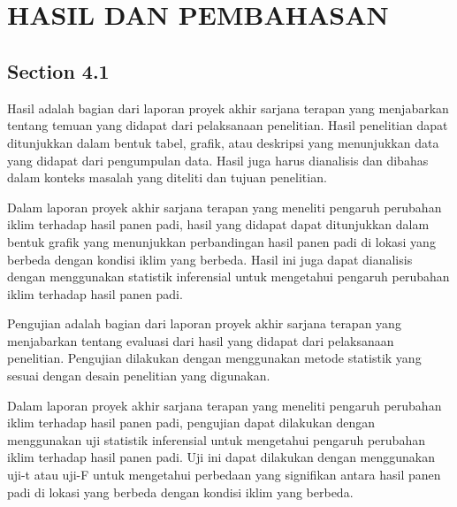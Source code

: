 
\chapter[HASIL DAN PEMBAHASAN]{\\ HASIL DAN PEMBAHASAN}

\section{Section 4.1}
Hasil adalah bagian dari laporan proyek akhir sarjana terapan yang menjabarkan tentang temuan yang didapat dari pelaksanaan penelitian. Hasil penelitian dapat ditunjukkan dalam bentuk tabel, grafik, atau deskripsi yang menunjukkan data yang didapat dari pengumpulan data. Hasil juga harus dianalisis dan dibahas dalam konteks masalah yang diteliti dan tujuan penelitian.

Dalam laporan proyek akhir sarjana terapan yang meneliti pengaruh perubahan iklim terhadap hasil panen padi, hasil yang didapat dapat ditunjukkan dalam bentuk grafik yang menunjukkan perbandingan hasil panen padi di lokasi yang berbeda dengan kondisi iklim yang berbeda. Hasil ini juga dapat dianalisis dengan menggunakan statistik inferensial untuk mengetahui pengaruh perubahan iklim terhadap hasil panen padi.

Pengujian adalah bagian dari laporan proyek akhir sarjana terapan yang menjabarkan tentang evaluasi dari hasil yang didapat dari pelaksanaan penelitian. Pengujian dilakukan dengan menggunakan metode statistik yang sesuai dengan desain penelitian yang digunakan.

Dalam laporan proyek akhir sarjana terapan yang meneliti pengaruh perubahan iklim terhadap hasil panen padi, pengujian dapat dilakukan dengan menggunakan uji statistik inferensial untuk mengetahui pengaruh perubahan iklim terhadap hasil panen padi. Uji ini dapat dilakukan dengan menggunakan uji-t atau uji-F untuk mengetahui perbedaan yang signifikan antara hasil panen padi di lokasi yang berbeda dengan kondisi iklim yang berbeda.

